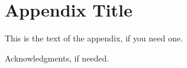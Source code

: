 \documentclass[preprint]{sigplanconf}
\begin{document}
\appendix
\section{Appendix Title}

This is the text of the appendix, if you need one.

\acks

Acknowledgments, if needed.











\end{document}
